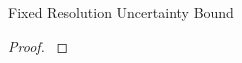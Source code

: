 \begin{theorem}{Fixed Resolution Uncertainty Bound}
\label{thm:fixed-resolution-algo-uncertainty-bound}

\end{theorem}

\begin{proof}
\label{prf:fixed-resolution-algo-uncertainty-bound}

\end{proof}
